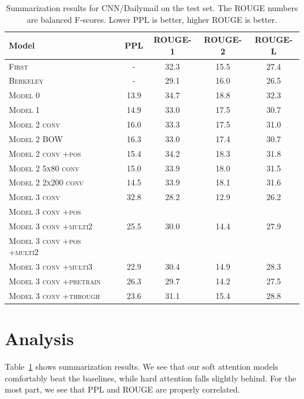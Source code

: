 \documentclass[12pt]{report}
\begin{document}
\begin{table}[h]
\centering
\begin{tabular}{llcccc}
 \toprule
 Model &  & PPL & ROUGE-1 & ROUGE-2 & ROUGE-L \\
 \midrule
\textsc{First} & & - & 32.3 & 15.5 & 27.4 \\
\textsc{Berkeley} & & - & 29.1 & 16.0 & 26.5 \\
\midrule
\textsc{Model 0} & & 13.9 & 34.7 & 18.8 & 32.3 \\
\midrule
 \textsc{Model 1} & & 14.9 & 33.0 & 17.5 & 30.7 \\
\midrule
\textsc{Model 2 conv} & & 16.0 & 33.3 & 17.5 & 31.0 \\
\textsc{Model 2 BOW} & & 16.3 & 33.0 & 17.4 & 30.7 \\
\textsc{Model 2 conv +pos} & & 15.4 & 34.2 & 18.3 & 31.8 \\
\textsc{Model 2 5x80 conv} & & 15.0 & 33.9 & 18.0 & 31.5 \\
\textsc{Model 2 2x200 conv} & & 14.5 & 33.9 & 18.1 & 31.6 \\
\midrule
\textsc{Model 3 conv} & & 32.8 & 28.2 & 12.9 & 26.2 \\
\textsc{Model 3 conv +pos} & &  \\
\textsc{Model 3 conv +multi2} & & 25.5 & 30.0 & 14.4 & 27.9 \\
\textsc{Model 3 conv +pos +multi2} & &  \\
\textsc{Model 3 conv +multi3} & & 22.9 & 30.4 & 14.9 & 28.3 \\
\textsc{Model 3 conv +pretrain} & & 26.3 & 29.7 & 14.2 & 27.5\\
\textsc{Model 3 conv +through} & & 23.6 & 31.1 & 15.4 & 28.8 \\
 \bottomrule
\end{tabular}
\caption{Summarization results for CNN/Dailymail on the test set. The ROUGE numbers are balanced F-scores. Lower PPL is better, higher ROUGE is better.}
\label{table:summary}
\end{table}


\section{Analysis}


Table~\ref{table:summary} shows summarization results. We see that our soft attention models comfortably beat the baselines, while hard attention falls slightly behind.
For the most part, we see that PPL and ROUGE are properly correlated. 
\end{document}
